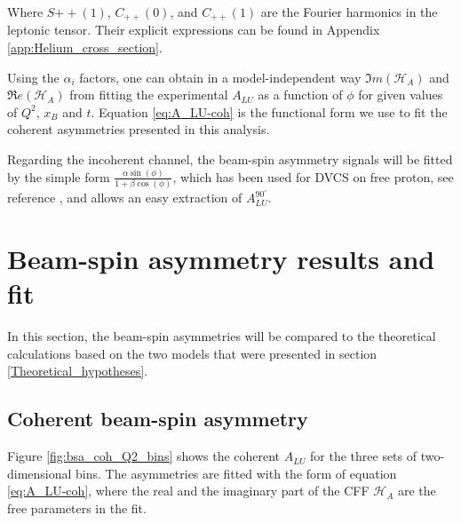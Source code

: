 Where $S{++}(1)$, $C_{++}(0)$, and $C_{++}(1)$ are the Fourier harmonics in the 
leptonic tensor. Their explicit expressions can be found in Appendix 
\ref{app:Helium_cross_section}.  

Using the $\alpha_{i}$ factors, one can obtain in a model-independent way $\Im
m(\mathcal{H}_{A})$ and $\Re e(\mathcal{H}_{A})$ from fitting the experimental 
$A_{LU}$ as a function of $\phi$ for given values of $Q^2$, $x_B$ and $t$.  
Equation \ref{eq:A_LU-coh} is the functional form we use to fit the coherent asymmetries 
presented in this analysis. 

Regarding the incoherent channel, the beam-spin 
asymmetry signals will be fitted by the simple form $\frac{\alpha \sin(\phi)}{1 + 
\beta \cos(\phi)}$, which has been used for DVCS on free proton, see reference 
\cite{FX_BSA, FX_analysis_note}, and allows an easy extraction of 
$A^{90^{\circ}}_{LU}$.  


\section{Beam-spin asymmetry results and fit}
In this section, the beam-spin asymmetries will be compared to the theoretical 
calculations based on the two models that were presented in section 
\ref{Theoretical_hypotheses}.

\subsection{Coherent beam-spin asymmetry}
Figure \ref{fig:bsa_coh_Q2_bins} shows the coherent $A_{LU}$ for the three 
sets of two-dimensional bins. The asymmetries are fitted with the form of
equation \ref{eq:A_LU-coh}, where the real and the imaginary part of the CFF 
$\mathcal{H}_{A}$ are the free parameters in the fit.

